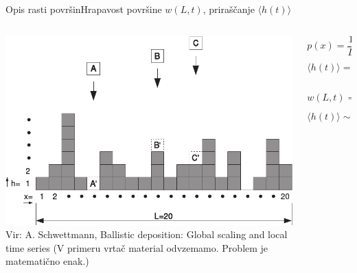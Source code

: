 \documentclass{beamer}
\begin{document}
\begin{frame}{Opis rasti površin}{Hrapavost površine $w(L,t)$, priraščanje $\langle h(t) \rangle$}
\begin{columns}
  \begin{column}{0.45\textwidth}
     \hspace*{-0.05\textwidth}\includegraphics[width=1.1\textwidth]{slike/bdep2.pdf}
     \newline
     \newline
     \tiny{Vir: A. Schwettmann, Ballistic deposition: Global scaling and local time series}
     \newline \newline
     \tiny{(V primeru vrtač material odvzemamo. Problem je matematično enak.)}
  \end{column}

  \begin{column}{0.55\textwidth}
    \footnotesize
    \begin{equation} p(x) = \frac{1}{L} \end{equation}
    \newline
    \begin{equation} \langle h(t) \rangle = \frac{1}{L} \sum_{i=1}^L h(x,t) \end{equation}
    \newline
    \begin{equation} w(L,t) = \sqrt{\frac{1}{L} \sum_{i=1}^L (h(x,t)-\bar{h}(t))^2} \end{equation}
    \newline
    \begin{equation} \langle h(t) \rangle \sim t \end{equation}
  \end{column}
\end{columns}
\end{frame}
\end{document}
